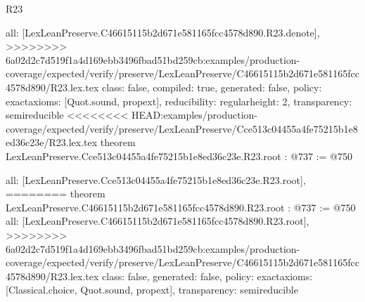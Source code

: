 \begin{lexlean}{R23}
\begin{coremodule}
{{{{{  all: [LexLeanPreserve.C46615115b2d671e581165fcc4578d890.R23.denote],
>>>>>>>> 6a02d2c7d519f1a4d169ebb3496fbad51bd259cb:examples/production-coverage/expected/verify/preserve/LexLeanPreserve/C46615115b2d671e581165fcc4578d890/R23.lex.tex
  class: false,
  compiled: true,
  generated: false,
  policy: exact{axioms: [Quot.sound, propext]},
  reducibility: regular{height: 2},
  transparency: semireducible
}
<<<<<<<< HEAD:examples/production-coverage/expected/verify/preserve/LexLeanPreserve/Cce513c04455a4fe75215b1e8ed36c23e/R23.lex.tex
theorem LexLeanPreserve.Cce513c04455a4fe75215b1e8ed36c23e.R23.root : @737 := @750 {
  all: [LexLeanPreserve.Cce513c04455a4fe75215b1e8ed36c23e.R23.root],
========
theorem LexLeanPreserve.C46615115b2d671e581165fcc4578d890.R23.root : @737 := @750 {
  all: [LexLeanPreserve.C46615115b2d671e581165fcc4578d890.R23.root],
>>>>>>>> 6a02d2c7d519f1a4d169ebb3496fbad51bd259cb:examples/production-coverage/expected/verify/preserve/LexLeanPreserve/C46615115b2d671e581165fcc4578d890/R23.lex.tex
  class: false,
  generated: false,
  policy: exact{axioms: [Classical.choice, Quot.sound, propext]},
  transparency: semireducible
}

}}}}}
\end{coremodule}
\end{lexlean}
